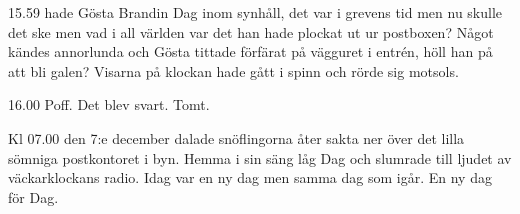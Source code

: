 15.59 hade Gösta Brandin Dag inom synhåll, det var i grevens tid men nu skulle det ske men vad i all världen var det han hade plockat ut ur postboxen? Något kändes annorlunda och Gösta tittade förfärat på vägguret i entrén, höll han på att bli galen? Visarna på klockan hade gått i spinn och rörde sig motsols.  

16.00 Poff. Det blev svart. Tomt.

Kl 07.00 den 7:e december dalade snöflingorna åter sakta ner över det lilla sömniga postkontoret i byn. Hemma i sin säng låg Dag och slumrade till ljudet av väckarklockans radio. Idag var en ny dag men samma dag som igår. En ny dag för Dag.                
